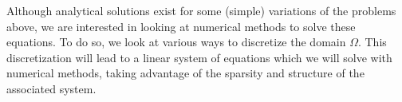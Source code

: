 Although analytical solutions exist for some (simple) variations of the problems above, we are interested in looking at numerical methods to solve these equations. To do so, we look at various ways to discretize the domain $\Omega$. This discretization will lead to a linear system of equations which we will solve with numerical methods, taking advantage of the sparsity and structure of the associated system.


